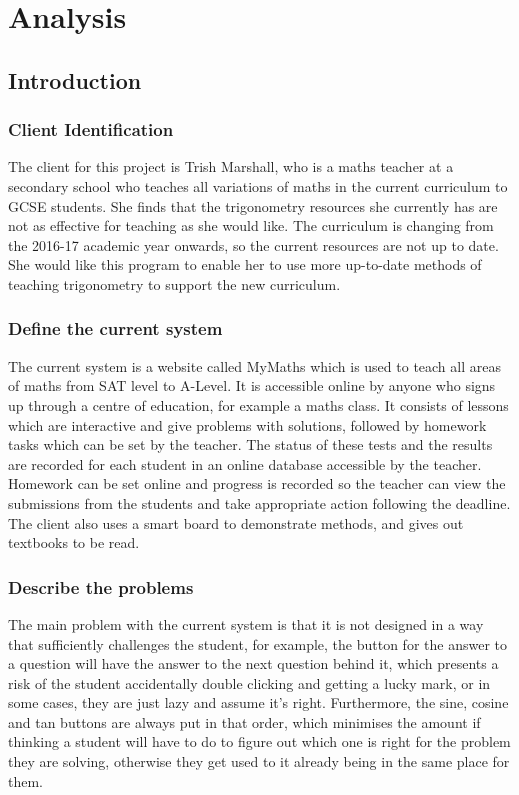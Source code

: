 \chapter{Analysis}

\section{Introduction}

\subsection{Client Identification}

The client for this project is Trish Marshall, who is a maths teacher at a secondary school who teaches all variations of maths in the current curriculum to GCSE students. She finds that the trigonometry resources she currently has are not as effective for teaching as she would like. The curriculum is changing from the 2016-17 academic year onwards, so the current resources are not up to date. She would like this program to enable her to use more up-to-date methods of teaching trigonometry to support the new curriculum.

\subsection{Define the current system}

The current system is a website called MyMaths which is used to teach all areas of maths from SAT level to A-Level. It is accessible online by anyone who signs up through a centre of education, for example a maths class. It consists of lessons which are interactive and give problems with solutions, followed by homework tasks which can be set by the teacher. The status of these tests and the results are recorded for each student in an online database accessible by the teacher. Homework can be set online and progress is recorded so the teacher can view the submissions from the students and take appropriate action following the deadline. The client also uses a smart board to demonstrate methods, and gives out textbooks to be read.

\subsection{Describe the problems}

The main problem with the current system is that it is not designed in a way that sufficiently challenges the student, for example, the button for the answer to a question will have the answer to the next question behind it, which presents a risk of the student accidentally double clicking and getting a lucky mark, or in some cases, they are just lazy and assume it's right. Furthermore, the sine, cosine and tan buttons are always put in that order, which minimises the amount if thinking a student will have to do to figure out which one is right for the problem they are solving, otherwise they get used to it already being in the same place for them.

